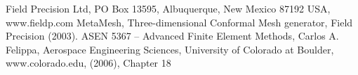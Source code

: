 \documentclass[a4paper]{article}
\begin{document}
\begin{thebibliography}{9}
   Field Precision Ltd, PO Box 13595, Albuquerque, New Mexico 87192 USA, www.fieldp.com
   MetaMesh, Three-dimensional Conformal Mesh generator, Field Precision (2003).
   ASEN 5367 -- Advanced Finite Element Methods, Carlos
A. Felippa, Aerospace Engineering Sciences, University of Colorado at
Boulder, www.colorado.edu, (2006), Chapter 18
\end{thebibliography}
\end{document}
